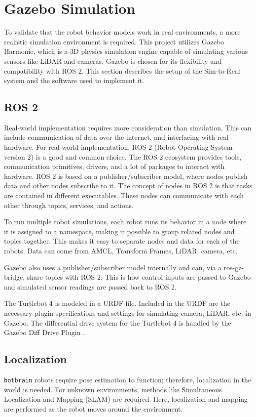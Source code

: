 \section{Gazebo Simulation}
To validate that the robot behavior models work in real environments, a more realistic simulation environment is required.
This project utilizes Gazebo Harmonic, which is a 3D physics simulation engine capable of simulating various sensors like LiDAR and cameras. Gazebo is chosen for its flexibility and compatibility with ROS 2.
This section describes the setup of the {\color{red}Sim-to-Real} system and the software used to implement it.

\subsection{ROS 2}\label{sub:ros_2}
Real-world implementation requires more consideration than simulation. This can include communication of data over the internet, and interfacing with real hardware.
For real-world implementation, ROS 2 (Robot Operating System version 2) is a good and common choice. The ROS 2 ecosystem provides tools, communication primitives, drivers, and a lot of packages to interact with hardware. ROS 2 is based on a publisher/subscriber model, where nodes publish data and other nodes subscribe to it.
The concept of nodes in ROS 2 is that tasks are contained in different executables. These nodes can communicate with each other through topics, services, and actions.

To run multiple robot simulations, each robot runs its behavior in a node where it is assigned to a namespace, making it possible to group related nodes and topics together.
This makes it easy to separate nodes and data for each of the robots. Data can come from AMCL, Transform Frames, LiDAR, camera, etc.

Gazebo also uses a publisher/subscriber model internally and can, via a ros-gz-bridge, share topics with ROS 2. This is how control inputs are passed to Gazebo and simulated sensor readings are passed back to ROS 2.

The Turtlebot 4 is modeled in a URDF file. Included in the URDF are the necessary plugin specifications and settings for simulating camera, LiDAR, etc. in Gazebo. The differential drive system for the Turtlebot 4 is handled by the Gazebo Diff Drive Plugin \cite{gz-diff-drive}.

\subsection{Localization}\label{sub:localization} 
\texttt{botbrain} robots require pose estimation to function; therefore, localization in the world is needed.
For unknown environments, methods like Simultaneous Localization and Mapping (SLAM) are required. Here, localization and mapping are performed as the robot moves around the environment.

